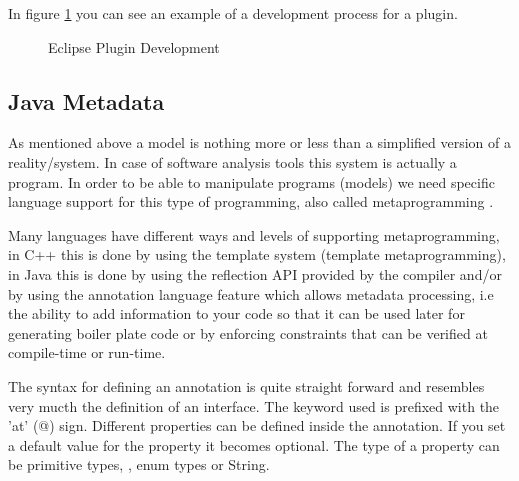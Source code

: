 	In figure \ref{fig:eclipsePlugin} you can see an example of a development
process for a plugin.

\begin{figure}[h]
\centering
{}
\caption{Eclipse Plugin Development \cite{figure:eclipsePlugin}}
\label{fig:eclipsePlugin}
\end{figure}	

\subsection{Java Metadata}\label{ch:2.1.2}

	
	As mentioned above a model is nothing more or less than a simplified version of
a reality/system. In case of software analysis tools this system is actually a
program. In order to be able to manipulate programs (models) we need specific
language support for this type of programming, also called metaprogramming
\cite{website:metaprogramming}. 

	Many languages have different ways and levels of supporting metaprogramming,
in C++ this is done by using the template system (template metaprogramming), in
Java this is done by using the reflection API provided by the compiler and/or by using the annotation
language feature which allows metadata processing, i.e the ability to add
information to your code so that it can be used later for generating boiler
plate code or by enforcing constraints that can be verified at compile-time or
run-time. \cite{book:ThinkingInJava} 
	
	The syntax for defining an annotation is quite straight forward and resembles
very mucth the definition of an interface. The keyword used is 
prefixed with the 'at' (@) sign. Different properties can be defined inside the annotation. If you set a default
value for the property it becomes optional. The type of a property can be 
primitive types, , enum types or String.
	
